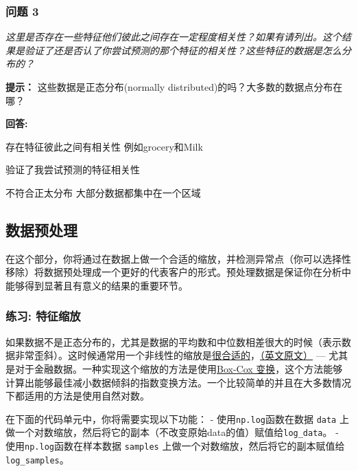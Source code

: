 \documentclass[11pt]{article}
\begin{document}
    \subsubsection{问题 3}\label{ux95eeux9898-3}

\emph{这里是否存在一些特征他们彼此之间存在一定程度相关性？如果有请列出。这个结果是验证了还是否认了你尝试预测的那个特征的相关性？这些特征的数据是怎么分布的？}

\textbf{提示：} 这些数据是正态分布(normally
distributed)的吗？大多数的数据点分布在哪？

    \textbf{回答:}

存在特征彼此之间有相关性 例如grocery和Milk

验证了我尝试预测的特征相关性

不符合正太分布 大部分数据都集中在一个区域

    \subsection{数据预处理}\label{ux6570ux636eux9884ux5904ux7406}

在这个部分，你将通过在数据上做一个合适的缩放，并检测异常点（你可以选择性移除）将数据预处理成一个更好的代表客户的形式。预处理数据是保证你在分析中能够得到显著且有意义的结果的重要环节。

    \subsubsection{练习:
特征缩放}\label{ux7ec3ux4e60-ux7279ux5f81ux7f29ux653e}

如果数据不是正态分布的，尤其是数据的平均数和中位数相差很大的时候（表示数据非常歪斜）。这时候通常用一个非线性的缩放是\href{https://github.com/czcbangkai/translations/blob/master/use_of_logarithms_in_economics/use_of_logarithms_in_economics.pdf}{很合适的}，\href{http://econbrowser.com/archives/2014/02/use-of-logarithms-in-economics}{（英文原文）}
---
尤其是对于金融数据。一种实现这个缩放的方法是使用\href{http://scipy.github.io/devdocs/generated/scipy.stats.boxcox.html}{Box-Cox
变换}，这个方法能够计算出能够最佳减小数据倾斜的指数变换方法。一个比较简单的并且在大多数情况下都适用的方法是使用自然对数。

在下面的代码单元中，你将需要实现以下功能： -
使用\texttt{np.log}函数在数据 \texttt{data}
上做一个对数缩放，然后将它的副本（不改变原始data的值）赋值给\texttt{log\_data}。
- 使用\texttt{np.log}函数在样本数据 \texttt{samples}
上做一个对数缩放，然后将它的副本赋值给\texttt{log\_samples}。
\end{document}
